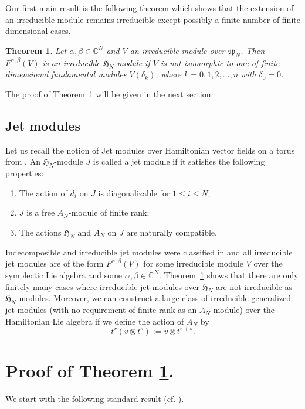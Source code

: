 \documentclass[a4paper,11pt]{amsart}
\numberwithin{equation}{section}
\theoremstyle{plain}
\newtheorem{theorem}{Theorem}[section]
\newcommand{\C}{\mathbb{C}}
\newcommand{\s}{\mathfrak{sp}_{N}}
\newcommand{\Ha}{\mathfrak{H}_{N}}
\begin{document}
Our first main result is the following theorem which shows that the extension of an irreducible module remains irreducible except possibly a finite number of finite dimensional cases.
 
\begin{theorem}\label{thm1}
Let $\alpha,\beta\in \C^N$ and $V$ an irreducible module over $\s$. Then $F^{\alpha,\beta}(V)$ is an irreducible   $\Ha$-module if $V$ is not isomorphic to one of finite dimensional fundamental modules $V(\delta_k)$, where $k=0,1,2,\dots, n$ with $\delta_0=0$.
\end{theorem}

The proof of Theorem~\ref{thm1} will be given in the next section.

\subsection{Jet modules}
Let us recall the notion of Jet modules over Hamiltonian vector fields on a torus from \cite{T18}. An $\Ha$-module $J$ is called a jet module if it  satisfies the following properties:
\begin{enumerate}
    \item The action of $d_i$ on $J$ is diagonalizable for $1\leq i\leq N$;
    \item $J$ is a free $A_N$-module of finite rank;
    \item The actions  $\Ha$ and $A_N$ on $J$ are naturally compatible.
\end{enumerate}
Indecomposible and irreducible jet modules were classified in \cite[Theorem 4.4,Theorem 5.2]{T18} and all irreducible jet modules are of the form $F^{\alpha,\beta}(V)$ for some irreducible module $V$ over the symplectic Lie algebra and some $\alpha,\beta \in \C^N$. Theorem~\ref{thm1} shows  that there are only finitely many cases where irreducible jet modules over $\Ha$ are  not  irreducible as $\Ha$-modules. Moreover,  we can construct a large class of irreducible generalized jet modules (with no requirement of finite rank as an  $A_N$-module) over the Hamiltonian Lie algebra if we define the action of $A_N$ by 
\[t^r (v\otimes t^s):=v\otimes t^{r+s}.\]

 

 
\section{Proof of Theorem \ref{thm1}.}

We start with the following standard result (cf. \cite[Lemma 2.4]{LZ15}).
\end{document}
